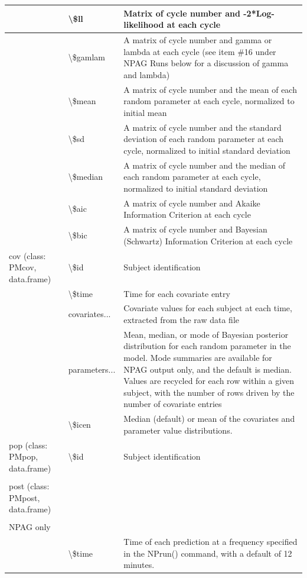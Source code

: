 \documentclass[
]{book}
\begin{document}
\begin{tabular}{l|l|l}
\hline
 & \textbackslash{}\$ll & Matrix of cycle number and -2*Log-likelihood at each cycle\\
\hline
 & \textbackslash{}\$gamlam & A matrix of cycle number and gamma or lambda at each cycle (see item \#16 under NPAG Runs below for a discussion of gamma and lambda)\\
\hline
 & \textbackslash{}\$mean & A matrix of cycle number and the mean of each random parameter at each cycle, normalized to initial mean\\
\hline
 & \textbackslash{}\$sd & A matrix of cycle number and the standard deviation of each random parameter at each cycle, normalized to initial standard deviation\\
\hline
 & \textbackslash{}\$median & A matrix of cycle number and the median of each random parameter at each cycle, normalized to initial standard deviation\\
\hline
 & \textbackslash{}\$aic & A matrix of cycle number and Akaike Information Criterion at each cycle\\
\hline
 & \textbackslash{}\$bic & A matrix of cycle number and Bayesian (Schwartz) Information Criterion at each cycle\\
\hline
cov (class: PMcov, data.frame) & \textbackslash{}\$id & Subject identification\\
\hline
 & \textbackslash{}\$time & Time for each covariate entry\\
\hline
 & covariates... & Covariate values for each subject at each time, extracted from the raw data file\\
\hline
 & parameters... & Mean, median, or mode of Bayesian posterior distribution for each random parameter in the model.  Mode summaries are available for NPAG output only, and the default is median.  Values are recycled for each row within a given subject, with the number of rows driven by the number of covariate entries\\
\hline
 & \textbackslash{}\$icen & Median (default) or mean of the covariates and parameter value distributions.\\
\hline
pop (class: PMpop, data.frame) & \textbackslash{}\$id & Subject identification\\
\hline
 &  & \\
\hline
post (class: PMpost, data.frame) &  & \\
\hline
 &  & \\
\hline
NPAG only &  & \\
\hline
 & \textbackslash{}\$time & Time of each prediction at a frequency specified in the NPrun() command, with a default of 12 minutes.\\

\end{tabular}
\end{document}
